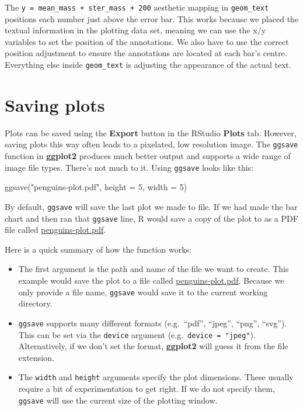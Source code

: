 \documentclass[
]{book}
\newenvironment{Shaded}{\begin{snugshade}}{\end{snugshade}}
\newcommand{\AttributeTok}[1]{\textcolor[rgb]{0.77,0.63,0.00}{#1}}
\newcommand{\DecValTok}[1]{\textcolor[rgb]{0.00,0.00,0.81}{#1}}
\newcommand{\FunctionTok}[1]{\textcolor[rgb]{0.00,0.00,0.00}{#1}}
\newcommand{\NormalTok}[1]{#1}
\newcommand{\StringTok}[1]{\textcolor[rgb]{0.31,0.60,0.02}{#1}}
\begin{document}
The \texttt{y\ =\ mean\_mass\ +\ ster\_mass\ +\ 200} aesthetic mapping in \texttt{geom\_text} positions each number just above the error bar. This works because we placed the textual information in the plotting data set, meaning we can use the x/y variables to set the position of the annotations. We also have to use the correct position adjustment to ensure the annotations are located at each bar's centre. Everything else inside \texttt{geom\_text} is adjusting the appearance of the actual text.

\hypertarget{saving-plots}{%
\section{Saving plots}\label{saving-plots}}

Plots can be saved using the \textbf{Export} button in the RStudio \textbf{Plots} tab. However, saving plots this way often leads to a pixelated, low resolution image. The \texttt{ggsave} function in \textbf{ggplot2} produces much better output and supports a wide range of image file types. There's not much to it. Using \texttt{ggsave} looks like this:

\begin{Shaded}
\begin{Highlighting}[]
\FunctionTok{ggsave}\NormalTok{(}\StringTok{"penguins{-}plot.pdf"}\NormalTok{, }\AttributeTok{height =} \DecValTok{5}\NormalTok{, }\AttributeTok{width =} \DecValTok{5}\NormalTok{)}
\end{Highlighting}
\end{Shaded}

By default, \texttt{ggsave} will save the last plot we made to file. If we had made the bar chart and then ran that \texttt{ggsave} line, R would save a copy of the plot to as a PDF file called \href{images/penguins-plot.pdf}{penguins-plot.pdf}.

Here is a quick summary of how the function works:

\begin{itemize}
\item
  The first argument is the path and name of the file we want to create. This example would save the plot to a file called \underline{penguins-plot.pdf}. Because we only provide a file name, \texttt{ggsave} would save it to the current working directory.
\item
  \texttt{ggsave} supports many different formats (e.g.~``pdf'', ``jpeg'', ``png'', ``svg''). This can be set via the \texttt{device} argument (e.g.~\texttt{device\ =\ "jpeg"}). Alternatively, if we don't set the format, \textbf{ggplot2} will guess it from the file extension.
\item
  The \texttt{width} and \texttt{height} arguments specify the plot dimensions. These usually require a bit of experimentation to get right. If we do not specify them, \texttt{ggsave} will use the current size of the plotting window.
\end{itemize}
\end{document}
